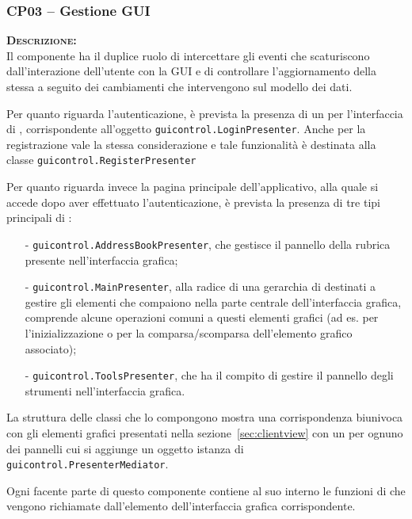 \subsubsection{CP03 -- Gestione GUI}
\begin{description}
	\item{\scshape\bfseries Descrizione:}\\
Il componente ha il duplice ruolo di intercettare gli eventi che scaturiscono dall'interazione dell'utente con la GUI e di controllare l'aggiornamento della stessa a seguito dei cambiamenti che intervengono sul modello dei dati.

Per quanto riguarda l'autenticazione, è prevista la presenza di un  per l'interfaccia di , corrispondente all'oggetto \texttt{guicontrol.LoginPresenter}. Anche per la registrazione vale la stessa considerazione e tale funzionalità è destinata alla classe \texttt{guicontrol.RegisterPresenter}

Per quanto riguarda invece la pagina principale dell'applicativo, alla quale si accede dopo aver effettuato l'autenticazione, è prevista la presenza di tre tipi principali di :
\begin{itemize}[noitemsep,nolistsep]
  \item[-] \texttt{guicontrol.AddressBookPresenter}, che gestisce il pannello della rubrica presente nell'interfaccia grafica;
  \item[-] \texttt{guicontrol.MainPresenter}, alla radice di una gerarchia di  destinati a gestire gli elementi che compaiono nella parte centrale dell'interfaccia grafica, comprende alcune operazioni comuni a questi elementi grafici (ad es. per l'inizializzazione o per la comparsa/scomparsa dell'elemento grafico associato);
  \item[-] \texttt{guicontrol.ToolsPresenter}, che ha il compito di gestire il pannello degli strumenti nell'interfaccia grafica.
\end{itemize}

La struttura delle classi che lo compongono mostra una corrispondenza biunivoca con gli elementi grafici presentati nella sezione~\ref{sec:clientview} con un  per ognuno dei pannelli cui si aggiunge un oggetto istanza di \texttt{guicontrol.PresenterMediator}.

Ogni  facente parte di questo componente contiene al suo interno le funzioni di  che vengono richiamate dall'elemento dell'interfaccia grafica corrispondente.


\end{description}
